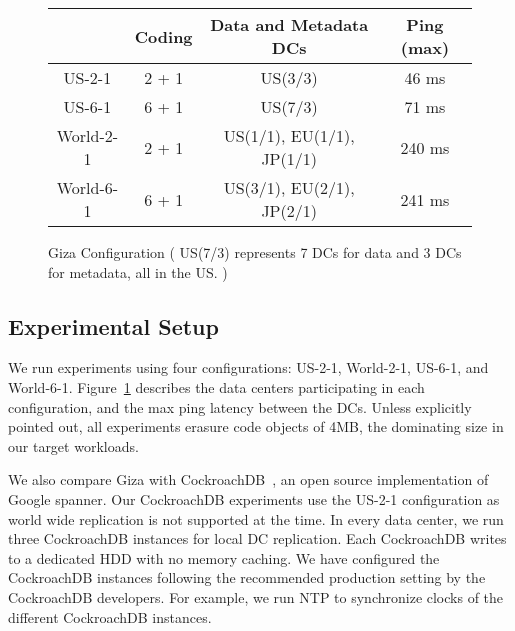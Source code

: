 \begin{figure}
\footnotesize
\centering
\begin{tabular}{c|c|c|c}
          & Coding & Data and Metadata DCs & Ping (max)\\
\hline
US-2-1 	  & 2 + 1 & US(3/3)                   & 46 ms \\
US-6-1 	  & 6 + 1 & US(7/3)                   & 71 ms\\ 
World-2-1 & 2 + 1 & US(1/1), EU(1/1), JP(1/1) & 240 ms\\
World-6-1 & 6 + 1 & US(3/1), EU(2/1), JP(2/1) & 241 ms\\
\end{tabular}
\caption{Giza Configuration ( US(7/3) represents 7 DCs for data and 3 DCs for metadata, all in the US. )} 
\label{fig:dcconfig} 
\end{figure}

\subsection{Experimental Setup}
We run experiments using four configurations: US-2-1, World-2-1, US-6-1, and World-6-1. Figure~\ref{fig:dcconfig} describes the data centers participating in each configuration, and the max ping latency between the DCs. Unless explicitly pointed out, all experiments erasure code objects of 4MB, the dominating size in our target workloads.

We also compare Giza with CockroachDB~\cite{cockroachdb}, an open source implementation of Google spanner. Our CockroachDB experiments use the US-2-1 configuration as world wide replication is not supported at the time. In every data center, we run three CockroachDB instances for local DC replication. Each CockroachDB writes to a dedicated HDD with no memory caching. We have configured the CockroachDB instances following the recommended production setting by the CockroachDB developers. For example, we run NTP to synchronize clocks of the different CockroachDB instances.


